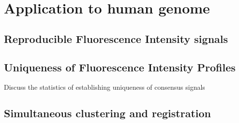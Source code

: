 \chapter{Application to human genome}

\section{Reproducible Fluorescence Intensity signals}

\section{Uniqueness of Fluorescence Intensity Profiles}
Discuss the statistics of establishing uniqueness of consensus signals

\section{Simultaneous clustering and registration}



